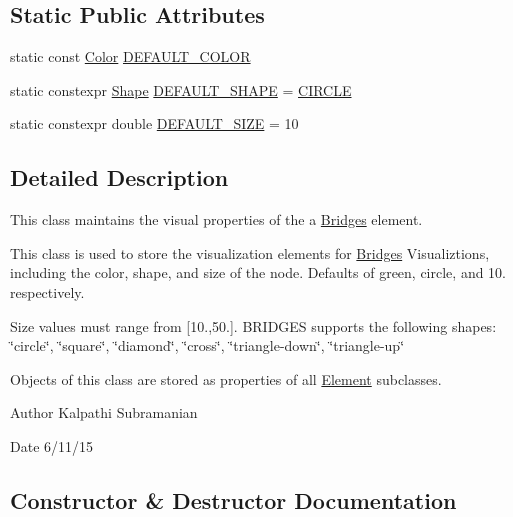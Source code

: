 \subsection*{Static Public Attributes}
\begin{DoxyCompactItemize}
\item 
static const \hyperlink{classbridges_1_1_color}{Color} \hyperlink{classbridges_1_1_element_visualizer_ade224640b18e3f6eed42098ea0ad5b3a}{D\+E\+F\+A\+U\+L\+T\+\_\+\+C\+O\+L\+OR}
\item 
static constexpr \hyperlink{namespacebridges_a1b4050586bd708782ae0d4f3b06b9579}{Shape} \hyperlink{classbridges_1_1_element_visualizer_a2800a212357180e4941a818b958aabd9}{D\+E\+F\+A\+U\+L\+T\+\_\+\+S\+H\+A\+PE} = \hyperlink{namespacebridges_a1b4050586bd708782ae0d4f3b06b9579aa968bf0f7aeccbae1a40751345bf2e64}{C\+I\+R\+C\+LE}
\item 
static constexpr double \hyperlink{classbridges_1_1_element_visualizer_a81cc788d6149d5d582099cbc35e18c5a}{D\+E\+F\+A\+U\+L\+T\+\_\+\+S\+I\+ZE} = 10
\end{DoxyCompactItemize}


\subsection{Detailed Description}
This class maintains the visual properties of the a \hyperlink{namespacebridges_1_1_bridges}{Bridges} element. 

This class is used to store the visualization elements for \hyperlink{namespacebridges_1_1_bridges}{Bridges} Visualiztions, including the color, shape, and size of the node. Defaults of green, circle, and 10. respectively.

Size values must range from \mbox{[}10.,50.\mbox{]}. B\+R\+I\+D\+G\+ES supports the following shapes\+: \char`\"{}circle\char`\"{}, \char`\"{}square\char`\"{}, \char`\"{}diamond\char`\"{}, \char`\"{}cross\char`\"{}, \char`\"{}triangle-\/down\char`\"{}, \char`\"{}triangle-\/up\char`\"{}

Objects of this class are stored as properties of all \hyperlink{classbridges_1_1_element}{Element} subclasses.

\begin{DoxyAuthor}{Author}
Kalpathi Subramanian 
\end{DoxyAuthor}
\begin{DoxyDate}{Date}
6/11/15 
\end{DoxyDate}


\subsection{Constructor \& Destructor Documentation}
\hypertarget{classbridges_1_1_element_visualizer_af792c8b0aaa76d07f5806df83f27ccb6}{}\label{classbridges_1_1_element_visualizer_af792c8b0aaa76d07f5806df83f27ccb6} 
